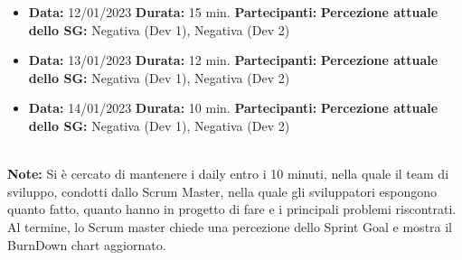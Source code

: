 \begin{landscape}
\begin{itemize}
            \item \textbf{Data:} 12/01/2023
            \newline \textbf{Durata:} 15 min.
            \newline \textbf{Partecipanti:} \uno
            \newline \textbf{Percezione attuale dello SG:} Negativa (Dev 1), Negativa (Dev 2)
        \end{itemize}
        \begin{itemize}
            \item \textbf{Data:} 13/01/2023
            \newline \textbf{Durata:} 12 min.
            \newline \textbf{Partecipanti:} \uno
            \newline \textbf{Percezione attuale dello SG:} Negativa (Dev 1), Negativa (Dev 2)
        \end{itemize}
        \begin{itemize}
            \item \textbf{Data:} 14/01/2023
            \newline \textbf{Durata:} 10 min.
            \newline \textbf{Partecipanti:} \uno
            \newline \textbf{Percezione attuale dello SG:} Negativa (Dev 1), Negativa (Dev 2)
        \end{itemize}
        \\
        \newline
        \newline \textbf{Note:} Si è cercato di mantenere i daily entro i 10 minuti, nella quale il team di sviluppo, condotti dallo Scrum Master, nella quale gli sviluppatori espongono quanto fatto, quanto hanno in progetto di fare e i principali problemi riscontrati. Al termine, lo Scrum master chiede una percezione dello Sprint Goal e mostra il BurnDown chart aggiornato.
        \newpage

\end{landscape}
